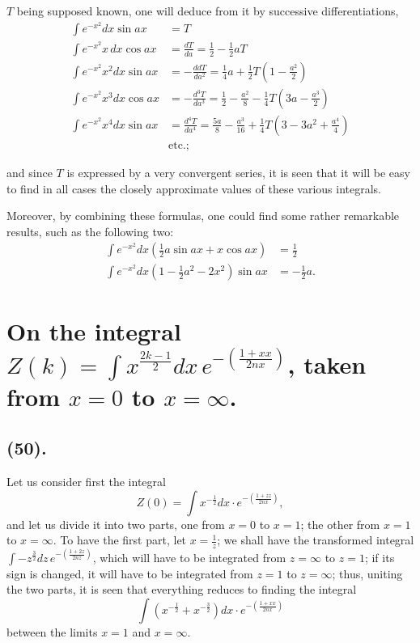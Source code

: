 \documentclass{article}
\begin{document}
$T$ being supposed known, one will deduce from it by successive differentiations,
\[ \begin{aligned} \int e^{-x^{2}}dx\sin ax&=T\\ \int e^{-x^{2}}x\,dx\cos ax&=\frac{dT}{da}=\frac{1}{2}-\frac{1}{2}aT\\ \int e^{-x^{2}}x^{2}dx\sin ax&=-\frac{ddT}{da^{2}}=\frac{1}{4}a+\frac{1}{2}T\left(1-\frac{a^{2}}{2}\right)\\ \int e^{-x^{2}}x^{3}dx\cos ax&=-\frac{d^{3}T}{da^{3}}=\frac{1}{2}-\frac{a^{2}}{8}-\frac{1}{4}T\left(3a-\frac{a^{3}}{2}\right)\\ \int e^{-x^{2}}x^{4}dx\sin ax&=\frac{d^{4}T}{da^{4}}=\frac{5a}{8}-\frac{a^{3}}{16}+\frac{1}{4}T\left(3-3a^{2}+\frac{a^{4}}{4}\right)\\ &\text{etc.}; \end{aligned} \]

and since $T$ is expressed by a very convergent series, it is seen that it will be easy to find in all cases the closely approximate values of these various integrals.

Moreover, by combining these formulas, one could find some rather remarkable results, such as the following two:
\[ \begin{aligned} \int e^{-x^{2}}dx\left(\tfrac{1}{2}a\sin ax+x\cos ax\right)&=\tfrac{1}{2}\\ \int e^{-x^{2}}dx\left(1-\tfrac{1}{2}a^{2}-2x^{2}\right)\sin ax&=-\tfrac{1}{2}a. \end{aligned} \]

\section*{On the integral $\displaystyle Z(k)=\int x^{\frac{2k-1}{2}}dx\,e^{-\left(\frac{1+xx}{2nx}\right)}$, taken from $x=0$ to $x=\infty$.}

\subsection*{(50).}

Let us consider first the integral
\[ Z(0)=\int x^{-\frac{1}{2}}dx\cdot e^{-\left(\frac{1+zz}{2nx}\right)}, \]
 and let us divide it into two parts, one from $x=0$ to $x=1$; the other from $x=1$ to $x=\infty$. To have the first part, let $x=\frac{1}{z}$; we shall have the transformed integral $\displaystyle\int-z^{\frac{3}{2}}dz\,e^{-\left(\frac{1+2z}{2nz}\right)}$, which will have to be integrated from $z=\infty$ to $z=1$; if its sign is changed, it will have to be integrated from $z=1$ to $z=\infty$; thus, uniting the two parts, it is seen that everything reduces to finding the integral
\[ \int\left(x^{-\frac{1}{2}}+x^{-\frac{3}{2}}\right)dx\cdot e^{-\left(\frac{1+xx}{2nx}\right)} \]
between the limits $x=1$ and $x=\infty$.
\end{document}
